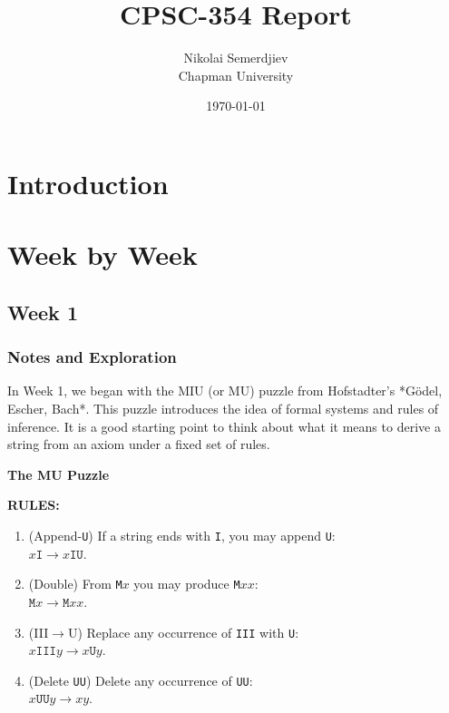 \documentclass{article}
\title{CPSC-354 Report}
\author{Nikolai Semerdjiev  \\ Chapman University}
\date{\today}
\theoremstyle{theorem}
\theoremstyle{definition}
\theoremstyle{remark}
\begin{document}
\maketitle

\begin{abstract}
\end{abstract}

\setcounter{tocdepth}{3}
\tableofcontents

\section{Introduction}\label{intro}

\section{Week by Week}\label{homework}

\subsection{Week 1}

\subsubsection{Notes and Exploration}

In Week 1, we began with the MIU (or MU) puzzle from Hofstadter’s *Gödel, Escher, Bach*. 
This puzzle introduces the idea of formal systems and rules of inference. 
It is a good starting point to think about what it means to derive a string from an axiom 
under a fixed set of rules.

\begin{center}
    \textbf{The MU Puzzle}
\end{center}

\textbf{RULES:}
\begin{enumerate}
  \item (Append-\texttt{U}) If a string ends with \texttt{I}, you may append \texttt{U}:\\
  \hspace{1em} $x\texttt{I} \to x\texttt{IU}$.
  \item (Double) From \texttt{M}$x$ you may produce \texttt{M}$xx$:\\
  \hspace{1em} $\texttt{M}x \to \texttt{M}xx$.
  \item (III$\to$U) Replace any occurrence of \texttt{III} with \texttt{U}:\\
  \hspace{1em} $x\texttt{III}y \to x\texttt{U}y$.
  \item (Delete \texttt{UU}) Delete any occurrence of \texttt{UU}:\\
  \hspace{1em} $x\texttt{UU}y \to xy$.
\end{enumerate}
\end{document}
